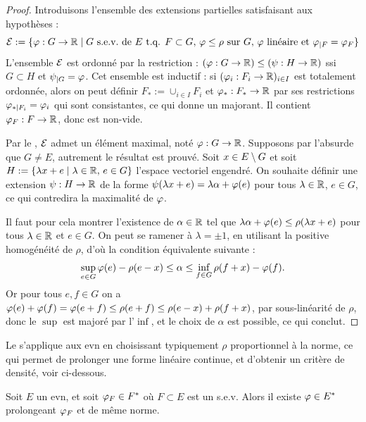 \begin{proof}
Introduisons l'ensemble des extensions partielles satisfaisant aux hypothèses : 
\begin{equation*}
	\mathcal{E} := \{\varphi : G \to \mathbb{R} \mid G \text{ s.e.v.\ de } E  \text{ t.q. }  F \subset G,\,  \varphi \leq \rho \text{ sur } G,\, \varphi \text{ linéaire et } \varphi_{|F} = \varphi_F\}
\end{equation*}
L'ensemble $\mathcal{E}$ est ordonné par la restriction : $(\varphi : G\to \mathbb{R}) \leq (\psi : H \to \mathbb{R})$ ssi $G \subset H$ et $\psi_{|G} = \varphi$. 
Cet ensemble est inductif : si $(\varphi_i : F_i \to \mathbb{R})_{i \in I}$ est totalement ordonnée, alors on peut définir $F_* := \cup_{i \in I} F_i$ et $\varphi_* : F_* \to \mathbb{R}$ par ses restrictions $\varphi_{*|F_i} = \varphi_i$ qui sont consistantes, ce qui donne un majorant. Il contient $\varphi_F : F \to \mathbb{R}$, donc est non-vide.

Par le , $\mathcal{E}$ admet un élément maximal, noté $\varphi : G \to \mathbb{R}$. Supposons par l'absurde que $G \neq E$, autrement le résultat est prouvé. Soit $x \in E \setminus G$ et soit $H := \{\lambda x+e \mid \lambda \in \mathbb{R},\, e \in G\}$ l'espace vectoriel engendré. On souhaite définir une extension $\psi : H \to \mathbb{R}$ de la forme $\psi(\lambda x + e) = \lambda \alpha + \varphi(e)$ pour tous $\lambda \in \mathbb{R}$, $e \in G$, ce qui contredira la maximalité de $\varphi$.

Il faut pour cela montrer l'existence de $\alpha \in \mathbb{R}$ tel que $\lambda \alpha + \varphi(e) \leq \rho(\lambda x + e)$ pour tous $\lambda \in \mathbb{R}$ et $e \in G$. 
On peut se ramener à $\lambda = \pm 1$, en utilisant la positive homogénéité de $\rho$, d'où la condition équivalente suivante : %
\begin{equation*}
	\sup_{e \in G} \varphi(e) - \rho(e-x) \leq \alpha \leq \inf_{f \in G} \rho(f+x)-\varphi(f). 
\end{equation*}
Or pour tous $e,f \in G$ on a $\varphi(e)+\varphi(f) = \varphi(e+f) \leq \rho(e+f) \leq \rho(e-x) + \rho(f+x)$, par sous-linéarité de $\rho$, donc le $\sup$ est majoré par l'$\inf$, et le choix de $\alpha$ est possible, ce qui conclut. 
\end{proof}

Le  s'applique aux evn en choisissant typiquement $\rho$ proportionnel à la norme, ce qui permet de prolonger une forme linéaire continue, et d'obtenir un critère de densité, voir ci-dessous. 
\begin{corollary}
\label{corol:prol_forme_evn}
%
	Soit $E$ un evn, et soit $\varphi_F \in F^*$ où $F\subset E$ est un s.e.v.
	Alors il existe $\varphi\in E^*$ prolongeant $\varphi_F$ et de même norme. 
\end{corollary}

